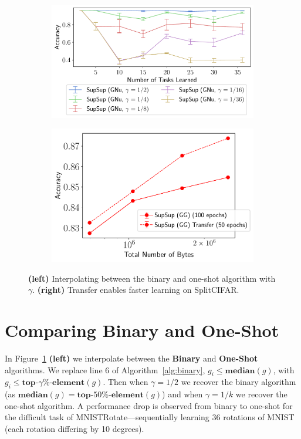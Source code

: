 \documentclass{article}
\begin{document}
\begin{figure}
    \begin{subfigure}{0.52\textwidth}
    \centering
    \includegraphics[scale=0.43]{rebuttal/rebut.pdf}
    \end{subfigure}
    \begin{subfigure}{0.48\textwidth}
    \centering
    \includegraphics[scale=0.47]{rebuttal/estop.pdf}
    \end{subfigure}
    \caption{\textbf{(left)} Interpolating between the binary and one-shot algorithm with $\gamma$. \textbf{(right)} Transfer enables faster learning on SplitCIFAR.}
         \label{fig:rf}
    \vspace*{-1em}
\end{figure}

\section{Comparing Binary and One-Shot}
In Figure~\ref{fig:rf} \textbf{(left)} we interpolate between the \textbf{Binary} and \textbf{One-Shot} algorithms. We replace line 6 of Algorithm~\ref{alg:binary}, $g_i \leq {\textbf{median}(g)}$, with $g_i \leq {\textbf{top-}\gamma\%\textbf{-element}(g)}$. Then when $\gamma=1/2$ we recover the binary algorithm (as $\textbf{median}(g) = \textbf{top-}50\%\textbf{-element}(g)$) and when $\gamma=1/k$ we recover the one-shot algorithm. A performance drop is observed from binary to one-shot for the difficult task of MNISTRotate---sequentially learning 36 rotations of MNIST (each rotation differing by 10 degrees).
\end{document}
